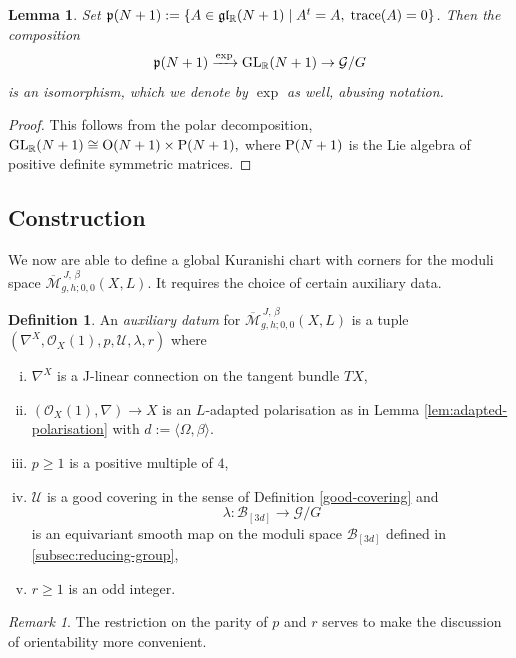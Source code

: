 \documentclass[11pt,psamsfonts, oneside, reqno]{amsart}
\newcommand{\cl}{\colon}
\newcommand{\xra}{\xrightarrow}
\newcommand{\conn}{\nabla}
\newcommand{\lspan}[1]{\langle {#1}\rangle}
\newcommand{\GL}{\normalfont\text{GL}}
\newcommand{\Mbar}{\overline{\mathcal M}}
\newcommand{\bR}{\mathbb{R}}
\newcommand{\cB}{\mathcal{B}}
\newcommand{\cG}{\mathcal{G}}
\newcommand{\cO}{\mathcal{O}}
\newcommand{\cU}{\mathcal{U}}
\newcommand{\fg}{\mathfrak{g}}
\newcommand{\fl}{\mathfrak{l}}
\newcommand{\fp}{\mathfrak{p}}
\newtheorem{lemma}[theorem]{Lemma}
\theoremstyle{definition}
\newtheorem{definition}[theorem]{Definition}
\theoremstyle{remark}
\newtheorem{remark}[theorem]{Remark}
\numberwithin{equation}{section}
\begin{document}
\begin{lemma}\label{lem:real-polar-decomposition} Set $\fp(N+1) := \{A\in \fg\fl_\bR(N+1)\mid A^t = A,\; \normalfont\text{trace}(A) = 0\}$. Then the composition 
	$$\fp(N+1)\xra{\exp} \GL_\bR(N+1)\to \cG/G$$\noindent
	is an isomorphism, which we denote by $\exp$ as well, abusing notation.
\end{lemma}

\begin{proof} This follows from the polar decomposition, $\GL_\bR(N+1) \cong \normalfont\text{O}(N+1)\times \normalfont\text{P}(N+1),$ where $\normalfont\text{P}(N+1)$ is the Lie algebra of positive definite symmetric matrices.
\end{proof}


\subsection{Construction}\label{subsec:overview} We now are able to define a global Kuranishi chart with corners for the moduli space $\Mbar_{g,h;0,0}^{\,J,\,\beta}(X,L)$. It requires the choice of certain auxiliary data.

\begin{definition}\label{de:aux-choices-defined}
	An \emph{auxiliary datum} for $\Mbar_{g,h;0,0}^{\,J,\,\beta}(X,L)$ is a tuple $(\nabla^X,\cO_X(1),p,\cU,\lambda,r)$  where
	\begin{enumerate}[i),leftmargin=25pt,ref=\roman*]
		\item $\nabla^X$ is a J-linear connection on the tangent bundle $TX$,
		\item\label{polarization-on-target} $(\cO_X(1),\conn)\to X$ is an $L$-adapted polarisation as in Lemma \ref{lem:adapted-polarisation} with $d := \lspan{\Omega,\beta}$.
		\item\label{framed-maps-etc} $p\ge 1$ is a positive multiple of $4$, 
		\item\label{aux-good-covering} $\cU$ is a good covering in the sense of Definition \ref{good-covering} and $$\lambda\cl \cB_{[3d]}\to \cG/G$$
		is an equivariant smooth map on the moduli space $\cB_{[3d]}$ defined in \textsection\ref{subsec:reducing-group},
		\item $r\geq 1 $ is an odd integer.
	\end{enumerate}
\end{definition}

\begin{remark} The restriction on the parity of $p$ and $r$ serves to make the discussion of orientability more convenient. \end{remark}
\end{document}
